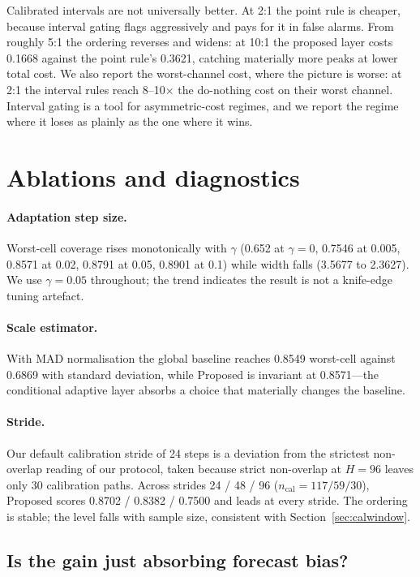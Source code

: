 \documentclass[11pt]{article}
\begin{document}
Calibrated intervals are not universally better. At 2:1 the point rule is cheaper, because interval gating flags aggressively and pays for it in false alarms. From roughly 5:1 the ordering reverses and widens: at 10:1 the proposed layer costs 0.1668 against the point rule's 0.3621, catching materially more peaks at lower total cost. We also report the worst-channel cost, where the picture is worse: at 2:1 the interval rules reach 8--10$\times$ the do-nothing cost on their worst channel. Interval gating is a tool for asymmetric-cost regimes, and we report the regime where it loses as plainly as the one where it wins.

\section{Ablations and diagnostics}\label{sec:ablations}

\paragraph{Adaptation step size.} Worst-cell coverage rises monotonically with $\gamma$ (0.652 at $\gamma=0$, 0.7546 at 0.005, 0.8571 at 0.02, 0.8791 at 0.05, 0.8901 at 0.1) while width falls (3.5677 to 2.3627). We use $\gamma=0.05$ throughout; the trend indicates the result is not a knife-edge tuning artefact.

\paragraph{Scale estimator.} With MAD normalisation the global baseline reaches 0.8549 worst-cell against 0.6869 with standard deviation, while Proposed is invariant at 0.8571---the conditional adaptive layer absorbs a choice that materially changes the baseline.

\paragraph{Stride.} Our default calibration stride of 24 steps is a deviation from the strictest non-overlap reading of our protocol, taken because strict non-overlap at $H=96$ leaves only 30 calibration paths. Across strides 24 / 48 / 96 ($n_{\text{cal}} = 117 / 59 / 30$), Proposed scores 0.8702 / 0.8382 / 0.7500 and leads at every stride. The ordering is stable; the level falls with sample size, consistent with Section~\ref{sec:calwindow}.

\subsection{Is the gain just absorbing forecast bias?}\label{sec:bias}
\end{document}
